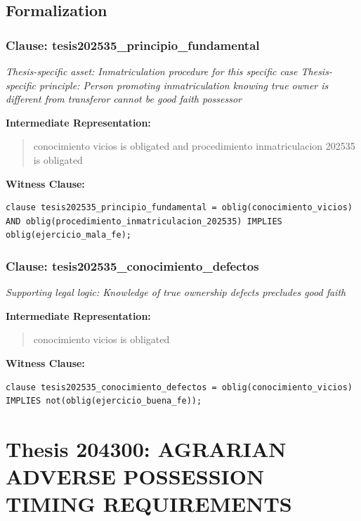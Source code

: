 \documentclass[11pt,a4paper]{article}
\begin{document}
\subsection{Formalization}

\subsubsection{Clause: tesis202535\_principio\_fundamental}

\textit{Thesis-specific asset: Inmatriculation procedure for this specific case Thesis-specific principle: Person promoting inmatriculation knowing true owner is different from transferor cannot be good faith possessor}

\textbf{Intermediate Representation:}

\begin{quote}
conocimiento vicios is obligated and procedimiento inmatriculacion 202535 is obligated
\end{quote}

\textbf{Witness Clause:}

\begin{lstlisting}[style=witnessstyle, language=Witness]
clause tesis202535_principio_fundamental = oblig(conocimiento_vicios) AND oblig(procedimiento_inmatriculacion_202535) IMPLIES oblig(ejercicio_mala_fe);
\end{lstlisting}

\subsubsection{Clause: tesis202535\_conocimiento\_defectos}

\textit{Supporting legal logic: Knowledge of true ownership defects precludes good faith}

\textbf{Intermediate Representation:}

\begin{quote}
conocimiento vicios is obligated
\end{quote}

\textbf{Witness Clause:}

\begin{lstlisting}[style=witnessstyle, language=Witness]
clause tesis202535_conocimiento_defectos = oblig(conocimiento_vicios) IMPLIES not(oblig(ejercicio_buena_fe));
\end{lstlisting}

\newpage

\section{Thesis 204300: AGRARIAN ADVERSE POSSESSION TIMING REQUIREMENTS}
\label{thesis:204300}
\end{document}

